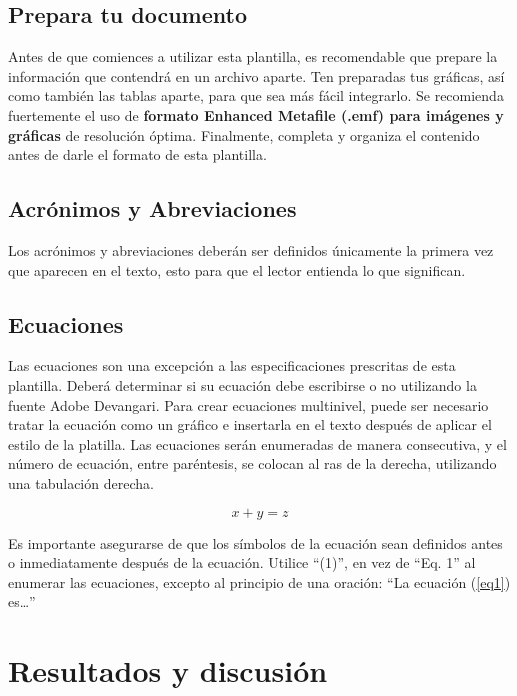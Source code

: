     \subsection{Prepara tu documento}
    
    Antes de que comiences a utilizar esta plantilla, es recomendable que prepare la información que contendrá en un archivo aparte. 
    Ten preparadas tus gráficas, así como también las tablas aparte, para que sea más fácil integrarlo. 
    Se recomienda fuertemente el uso de \textbf{formato Enhanced Metafile (.emf) para imágenes y gráficas} de resolución óptima. 
    Finalmente, completa y organiza el contenido antes de darle el formato de esta plantilla. 
    
    \subsection{Acrónimos y Abreviaciones}
    
    Los acrónimos y abreviaciones deberán ser definidos únicamente la primera vez que aparecen en el texto, esto para que el lector entienda lo que significan.
    
    \subsection{Ecuaciones}
    
    Las ecuaciones son una excepción a las especificaciones prescritas de esta plantilla. 
    Deberá determinar si su ecuación debe escribirse o no utilizando la fuente Adobe Devangari. 
    Para crear ecuaciones multinivel, puede ser necesario tratar la ecuación como un gráfico e insertarla en el texto después de aplicar el estilo de la platilla.
    Las ecuaciones serán enumeradas de manera consecutiva, y el número de ecuación, entre paréntesis, se colocan al ras de la derecha, utilizando una tabulación derecha. 
    
    \begin{equation}
        \label{eq1}
        x + y = z 
    \end{equation}
    
    Es importante asegurarse de que los símbolos de la ecuación sean definidos antes o inmediatamente después de la ecuación. Utilice “(1)”, en vez de “Eq. 1” al enumerar las ecuaciones, excepto al principio de una oración: “La ecuación (\ref{eq1}) es…”
    
    \section{Resultados y discusión}
    
